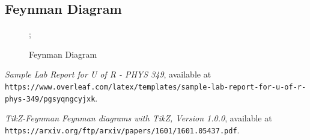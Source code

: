 \documentclass[letterpaper,12pt]{article}
\begin{document}
\subsection{Feynman Diagram\cite{TikZ-Feynman}}
\begin{figure}[h]
\centering
{};
\caption{Feynman Diagram}
\label{figure1.2}
\end{figure}
\begin{thebibliography}{99}

 \emph{Sample Lab Report for U of R - PHYS 349}, available at\\
\texttt{https://www.overleaf.com/latex/templates/sample-lab-report-for-u-of-r-phys-349/pgsyqngcyjxk}.

 \emph{TikZ-Feynman Feynman diagrams with TikZ, Version 1.0.0},  available at\\
\texttt{https://arxiv.org/ftp/arxiv/papers/1601/1601.05437.pdf}.

\end{thebibliography}
\end{document}
